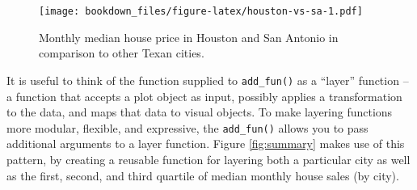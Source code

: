 \documentclass[12pt,]{isuthesis}
\newenvironment{Shaded}{\begin{snugshade}}{\end{snugshade}}
\newcommand{\KeywordTok}[1]{\textcolor[rgb]{0.13,0.29,0.53}{\textbf{{#1}}}}
\newcommand{\DataTypeTok}[1]{\textcolor[rgb]{0.13,0.29,0.53}{{#1}}}
\newcommand{\FloatTok}[1]{\textcolor[rgb]{0.00,0.00,0.81}{{#1}}}
\newcommand{\StringTok}[1]{\textcolor[rgb]{0.31,0.60,0.02}{{#1}}}
\newcommand{\CommentTok}[1]{\textcolor[rgb]{0.56,0.35,0.01}{\textit{{#1}}}}
\newcommand{\OtherTok}[1]{\textcolor[rgb]{0.56,0.35,0.01}{{#1}}}
\newcommand{\NormalTok}[1]{{#1}}
\begin{document}
\begin{figure}
\centering
\texttt{[image: bookdown\_files/figure-latex/houston-vs-sa-1.pdf]}
\caption{\label{fig:houston-vs-sa}Monthly median house price in Houston and
San Antonio in comparison to other Texan cities.}
\end{figure}

It is useful to think of the function supplied to \texttt{add\_fun()} as
a ``layer'' function -- a function that accepts a plot object as input,
possibly applies a transformation to the data, and maps that data to
visual objects. To make layering functions more modular, flexible, and
expressive, the \texttt{add\_fun()} allows you to pass additional
arguments to a layer function. Figure \ref{fig:summary} makes use of
this pattern, by creating a reusable function for layering both a
particular city as well as the first, second, and third quartile of
median monthly house sales (by city).

\begin{Shaded}
\end{Shaded}
\end{document}
